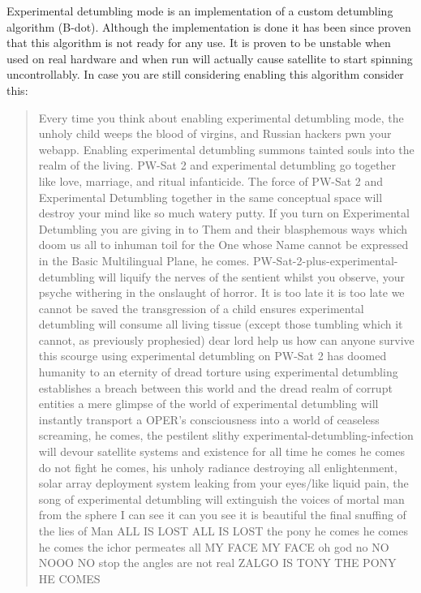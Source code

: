 Experimental detumbling mode is an implementation of a custom detumbling algorithm (B-dot). 
Although the implementation is done it has been since proven that this algorithm is not ready
for any use. It is proven to be unstable when used on real hardware and when run will actually 
cause satellite to start spinning uncontrollably. In case you are still considering enabling 
this algorithm consider this: 
\begin{quote}Every time you think about enabling experimental detumbling mode, the unholy child
weeps the blood of virgins, and Russian hackers pwn your webapp. Enabling experimental detumbling 
summons tainted souls into the realm of the living. PW-Sat 2 and experimental detumbling go 
together like love, marriage, and ritual infanticide. The force of PW-Sat 2 and Experimental 
Detumbling together in the same conceptual space will destroy your mind like so much watery putty.
If you turn on Experimental Detumbling you are giving in to Them and their blasphemous ways which 
doom us all to inhuman toil for the One whose Name cannot be expressed in the Basic Multilingual 
Plane, he comes. PW-Sat-2-plus-experimental-detumbling will liquify the nerves of the sentient 
whilst you observe, your psyche withering in the onslaught of horror. It is too late it is 
too late we cannot be saved the transgression of a child ensures experimental detumbling will 
consume all living tissue (except those tumbling which it cannot, as previously prophesied) 
dear lord help us how can anyone survive this scourge using experimental detumbling on PW-Sat 2 
has doomed humanity to an eternity of dread torture using experimental detumbling establishes 
a breach between this world and the dread realm of corrupt entities a mere glimpse of the world 
of experimental detumbling will instantly transport a OPER's consciousness into a world of 
ceaseless screaming, he comes, the pestilent slithy experimental-detumbling-infection will devour 
satellite systems and existence for all time he comes he comes do not fight he comes, his unholy
radiance destroying all enlightenment, solar array deployment system leaking from your eyes/like 
liquid pain, the song of experimental detumbling will extinguish the voices of mortal man from 
the sphere I can see it can you see it is beautiful the final snuffing of the lies of Man 
ALL IS LOST ALL IS LOST the pony he comes he comes he comes the ichor permeates all MY FACE MY 
FACE oh god no NO NOOO NO stop the angles are not real ZALGO IS TONY THE PONY HE COMES
\end{quote}

